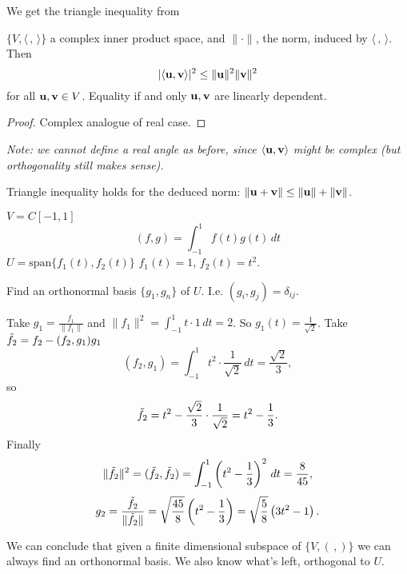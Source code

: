 \documentclass[10pt, a4paper]{article}
\begin{document}
We get the triangle inequality from
\begin{theorem}
    $\{V, \langle\,,\,\rangle\}$ a complex inner product space,
    and $\|\cdot\|$,
    the norm,
    induced by $\langle\,,\,\rangle$.
    Then
    \[
    |\langle\mathbf{u}, \mathbf{v}\rangle| ^ 2 \leq \|\mathbf{u}\| ^ 2\|\mathbf{v}\| ^ 2
    \]
    for all $\mathbf{u}, \mathbf{v} \in V$.
    Equality if and only $\mathbf{u}, \mathbf{v}$ are linearly dependent.

    \begin{proof}
        Complex analogue of real case.
    \end{proof}
\end{theorem}

\textit{Note:
we cannot define a real angle as before,
since $\langle\mathbf{u}, \mathbf{v}\rangle$ might be complex
(but orthogonality still makes sense).}

\begin{corollary}
    Triangle inequality holds for the deduced norm:
    $\|\mathbf{u} + \mathbf{v}\| \leq \|\mathbf{u}\| + \|\mathbf{v}\|$.
\end{corollary}

\begin{example}
    $V = C[-1, 1]$
    \[
    (f, g) = \int_{-1}^{1}f(t)g(t)\,dt
    \]
    $U = \mathrm{span}\{f_1(t), f_2(t)\}$
    $f_1(t) = 1$,
    $f_2(t) = t ^ 2$.

    Find an orthonormal basis $\{g_1, g_n\}$ of $U$.
    I.e. $(g_i, g_j) = \delta_{ij}$.

    \begin{solution}
        Take $g_1 = \frac{f_1}{\|f_1\|}$ and $\|f_1\| ^ 2 = \int_{-1}^{1}t\cdot 1\,dt = 2$.
        So $g_1(t) = \frac{1}{\sqrt{2}}$.
        Take $\Tilde{f}_2 = f_2 - (f_2, g_1)g_1$
        \[
        (f_2, g_1) = \int_{-1}^{1}t ^ 2\cdot\frac{1}{\sqrt{2}}\,dt = \frac{\sqrt{2}}{3},
        \]
        so
        \[
        \Tilde{f}_2 = t ^ 2 - \frac{\sqrt{2}}{3}\cdot\frac{1}{\sqrt{2}} = t ^ 2 - \frac{1}{3}.
        \]
        Finally
        \[
        \|\Tilde{f}_2\| ^ 2 = (\Tilde{f}_2, \Tilde{f}_2) = \int_{-1}^{1}\left(t ^ 2 - \frac{1}{3}\right) ^ 2\,dt = \frac{8}{45},
        \]
        \[
        g_2 = \frac{\Tilde{f}_2}{\|\Tilde{f}_2\|} = \sqrt{\frac{45}{8}}\left(t ^2 - \frac{1}{3}\right) = \sqrt{\frac{5}{8}}\left(3t ^ 2 - 1\right).
        \]
    \end{solution}
\end{example}

We can conclude that given a finite dimensional subspace of $\{V, (\,,)\}$ we can always find an orthonormal basis.
We also know what's left,
orthogonal to $U$.
\end{document}
